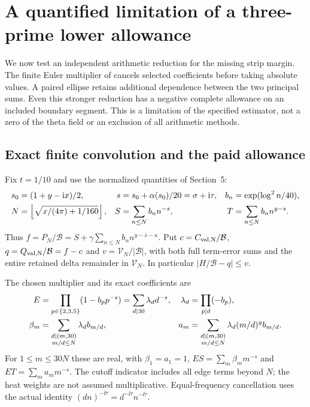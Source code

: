 \section{A quantified limitation of a three-prime lower allowance}
\label{sec:arithmetic-obstruction}

We now test an independent arithmetic reduction for the missing strip
margin. The finite Euler multiplier of \cite[Section~8.5]{Polymath2019}
cancels selected coefficients before taking absolute values. A paired
ellipse retains additional dependence between the two principal sums.
Even this stronger reduction has a negative complete allowance on an
included boundary segment. This is a limitation of the specified
estimator, not a zero of the theta field or an exclusion of all arithmetic
methods.

\subsection{Exact finite convolution and the paid allowance}

Fix $t=1/10$ and use the normalized quantities of Section~5:
\begin{align}
 s_0&=(1+y-\mathrm i x)/2,& s&=s_0+\alpha(s_0)/20=\sigma+\mathrm i\tau,
 &b_n&=\exp(\log^2 n/40),\notag\\
 N&=\left\lfloor\sqrt{x/(4\pi)+1/160}\right\rfloor,&
 S&=\sum_{n\le N}b_n n^{-s},&
 T&=\sum_{n\le N}b_n n^{y-s}.
 \label{af:definitions}
\end{align}
Thus $f=P_N/\mathcal B=S+\gamma\sum_{n\le N}b_n
n^{y-\bar s-\kappa}$. Put $c=C_{\rm val,N}/\mathcal B$,
$q=Q_{\rm val,N}/\mathcal B=f-c$ and
$v=\mathcal V_N/|\mathcal B|$, with both full term-error sums and
the entire retained delta remainder in $\mathcal V_N$. In particular
$|H/\mathcal B-q|\le v$.

The chosen multiplier and its exact coefficients are
\begin{align}
 E&=\prod_{p\in\{2,3,5\}}(1-b_p p^{-s})
   =\sum_{d\mid30}\lambda_d d^{-s},&
 \lambda_d&=\prod_{p\mid d}(-b_p),\notag\\
 \beta_m&=\sum_{\substack{d\mid(m,30)\\m/d\le N}}
                  \lambda_d b_{m/d},&
 a_m&=\sum_{\substack{d\mid(m,30)\\m/d\le N}}
                  \lambda_d(m/d)^y b_{m/d}.
 \label{af:convolution}
\end{align}
For $1\le m\le30N$ these are real, with $\beta_1=a_1=1$,
$ES=\sum_m\beta_m m^{-s}$ and $ET=\sum_m a_m m^{-s}$.
The cutoff indicator includes all edge terms beyond $N$; the heat weights
are not assumed multiplicative. Equal-frequency cancellation uses the
actual identity $(dn)^{-\ii\tau}=d^{-\ii\tau}n^{-\ii\tau}$.

